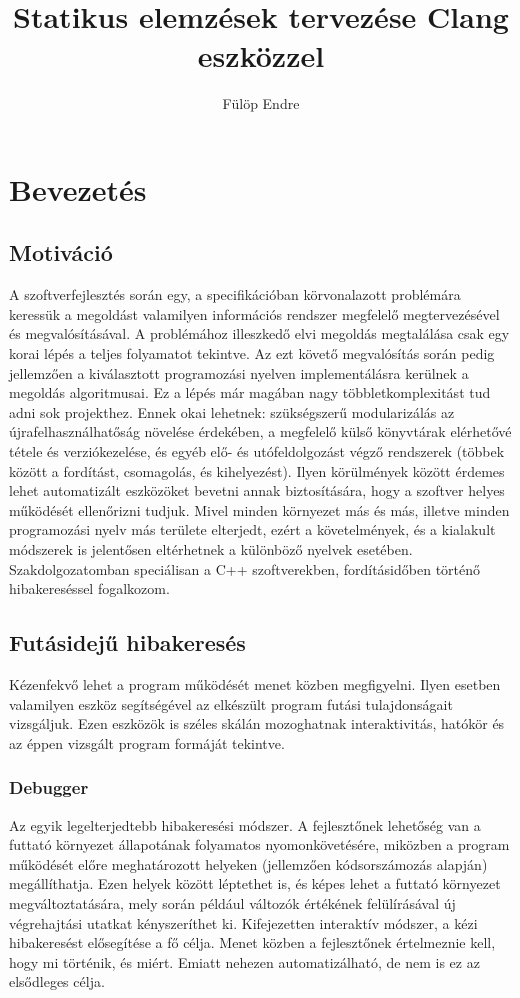 \documentclass[a4paper,12pt]{report}
\title{Statikus elemzések tervezése Clang eszközzel}
\author{Fülöp Endre}
\begin{document}
\begin{titlepage}
\maketitle
\end{titlepage}

\tableofcontents

\chapter{Bevezetés}
\section{Motiváció}
A szoftverfejlesztés során egy, a specifikációban körvonalazott problémára keressük a megoldást valamilyen információs rendszer megfelelő megtervezésével és megvalósításával. A problémához illeszkedő elvi megoldás megtalálása csak egy korai lépés a teljes folyamatot tekintve. Az ezt követő megvalósítás során pedig jellemzően a kiválasztott programozási nyelven implementálásra kerülnek a megoldás algoritmusai. Ez a lépés már magában nagy többletkomplexitást tud adni sok projekthez. Ennek okai lehetnek: szükségszerű modularizálás az újrafelhasználhatőság növelése érdekében, a megfelelő külső könyvtárak elérhetővé tétele és verziókezelése, és egyéb elő- és utófeldolgozást végző rendszerek (többek között a fordítást, csomagolás, és kihelyezést).
Ilyen körülmények között érdemes lehet automatizált eszközöket bevetni annak biztosítására, hogy a szoftver helyes működését ellenőrizni tudjuk.
Mivel minden környezet más és más, illetve minden programozási nyelv más területe elterjedt, ezért a követelmények, és a kialakult módszerek is jelentősen eltérhetnek a különböző nyelvek esetében.
Szakdolgozatomban speciálisan a C++ szoftverekben, fordításidőben történő hibakereséssel fogalkozom.
\section{Futásidejű hibakeresés}
Kézenfekvő lehet a program működését menet közben megfigyelni. Ilyen esetben valamilyen eszköz segítségével az elkészült program futási tulajdonságait vizsgáljuk. Ezen eszközök is széles skálán mozoghatnak interaktivitás, hatókör és az éppen vizsgált program formáját tekintve.
\subsection{Debugger}
Az egyik legelterjedtebb hibakeresési módszer. A fejlesztőnek lehetőség van a futtató környezet állapotának folyamatos nyomonkövetésére, miközben a program működését előre meghatározott helyeken (jellemzően kódsorszámozás alapján) megállíthatja. Ezen helyek között léptethet is, és képes lehet a futtató környezet megváltoztatására, mely során például változók értékének felülírásával új végrehajtási utatkat kényszeríthet ki. Kifejezetten interaktív módszer, a kézi hibakeresést elősegítése a fő célja. Menet közben a fejlesztőnek értelmeznie kell, hogy mi történik, és miért. Emiatt nehezen automatizálható, de nem is ez az elsődleges célja.
\end{document}
